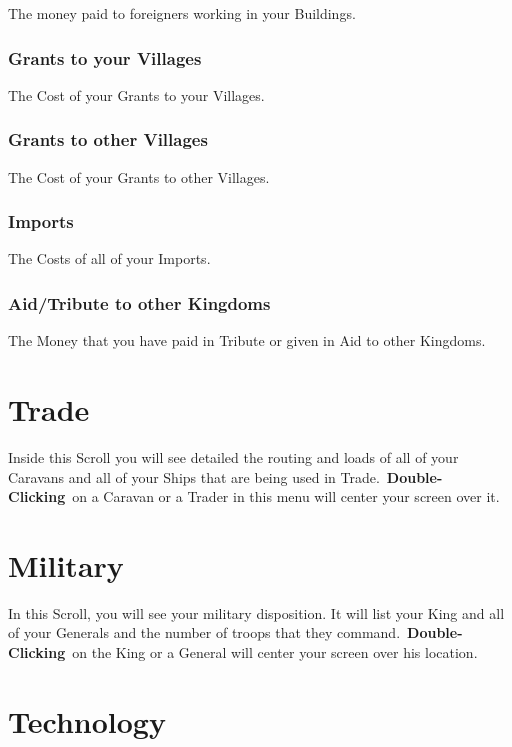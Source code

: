 The money paid to foreigners working in your Buildings.

\subsubsection{Grants to your Villages}

The Cost of your Grants to your Villages.

\subsubsection{Grants to other Villages}

The Cost of your Grants to other Villages.

\subsubsection{Imports}

The Costs of all of your Imports.

\subsubsection{Aid/Tribute to other Kingdoms}

The Money that you have paid in Tribute or given in Aid to other Kingdoms.

\section{Trade}


Inside this Scroll you will see detailed the routing and loads of all of your Caravans and all of your Ships that are being used in Trade. \textbf{Double-Clicking} on a Caravan or a Trader in this menu will center your screen over it.

\section{Military}


In this Scroll, you will see your military disposition. It will list your King and all of your Generals and the number of troops that they command. \textbf{Double-Clicking} on the King or a General will center your screen over his location.

\section{Technology}

